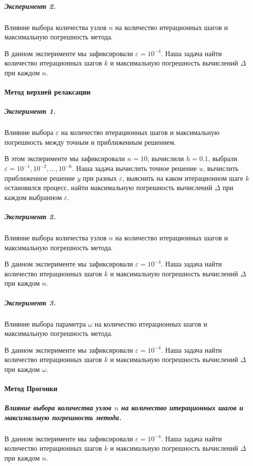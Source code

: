 \subparagraph{Эксперимент 2.}

Влияние выбора количества узлов $n$ на количество итерационных шагов и максимальную погрешность метода.

В данном эксперименте мы зафиксировали $\varepsilon = 10^{-4}$. Наша задача найти количество итерационных шагов $k$ и максимальную погрешность вычислений $\Delta$ при каждом $n$.



\newpage
\paragraph{Метод верхней релаксации}

\subparagraph{Эксперимент 1.}

Влияние выбора $\varepsilon$ на количество итерационных шагов и максимальную погрешность между точным и приближенным решением.

В этом эксперименте мы зафиксировали $n = 10$, вычислили $h=0.1$, выбрали $\varepsilon = 10^{-1}, 10^{-2}, \dots, 10^{-6}$. Наша задача вычислить точное решение $u$, вычислить приближенное решение $y$ при разных $\varepsilon$, выяснить на каком итерационном шаге $k$  остановился процесс, найти максимальную погрешность вычислений $\Delta$ при каждом выбранном $\varepsilon$.



\subparagraph{Эксперимент 2.}

Влияние выбора количества узлов $n$ на количество итерационных шагов и максимальную погрешность метода.

В данном эксперименте мы зафиксировали $\varepsilon = 10^{-4}$. Наша задача найти количество итерационных шагов $k$ и максимальную погрешность вычислений $\Delta$ при каждом $n$.



\subparagraph{Эксперимент 3.}

Влияние выбора параметра $\omega$ на количество итерационных шагов и максимальную погрешность метода.

В данном эксперименте мы зафиксировали $\varepsilon = 10^{-4}$. Наша задача найти количество итерационных шагов $k$ и максимальную погрешность вычислений $\Delta$ при каждом $\omega$.



\newpage
\paragraph{Метод Прогонки}

\subparagraph{Влияние выбора количества узлов $n$ на количество итерационных шагов и максимальную погрешность метода.}

В данном эксперименте мы зафиксировали $\varepsilon = 10^{-4}$. Наша задача найти количество итерационных шагов $k$ и максимальную погрешность вычислений $\Delta$ при каждом $n$.

